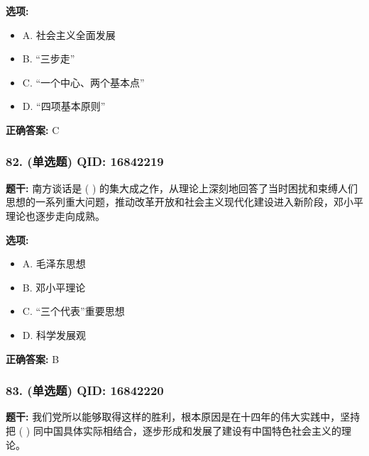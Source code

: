 \documentclass[12pt,UTF8]{ctexart}
\begin{document}
\textbf{选项:}
\begin{itemize}[leftmargin=*]

  \item A. 社会主义全面发展

  \item B. “三步走”

  \item C. “一个中心、两个基本点”

  \item D. “四项基本原则”

\end{itemize}

\textbf{正确答案:}
C

\vspace{0.3em}\hrulefill\vspace{0.7em}

\subsubsection*{82. (单选题) \small QID: 16842219}

\textbf{题干:}
南方谈话是 ( ) 的集大成之作，从理论上深刻地回答了当时困扰和束缚人们思想的一系列重大问题，推动改革开放和社会主义现代化建设进入新阶段，邓小平理论也逐步走向成熟。

\textbf{选项:}
\begin{itemize}[leftmargin=*]

  \item A. 毛泽东思想

  \item B. 邓小平理论

  \item C. “三个代表”重要思想

  \item D. 科学发展观

\end{itemize}

\textbf{正确答案:}
B

\vspace{0.3em}\hrulefill\vspace{0.7em}

\subsubsection*{83. (单选题) \small QID: 16842220}

\textbf{题干:}
我们党所以能够取得这样的胜利，根本原因是在十四年的伟大实践中，坚持把 ( ) 同中国具体实际相结合，逐步形成和发展了建设有中国特色社会主义的理论。
\end{document}
